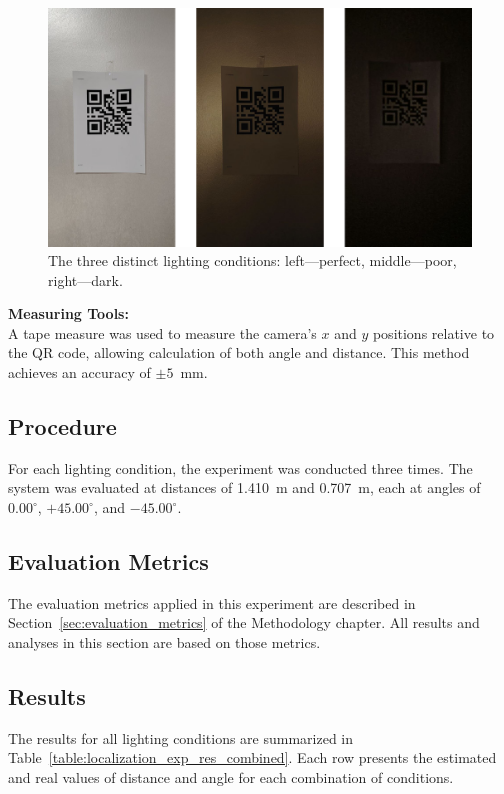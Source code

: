 \begin{figure}[h!]
	\centering
	\includegraphics[width=0.7\linewidth]{assets/ch4/Three lighting conditions/Three lighting conditions.png}
	\caption{The three distinct lighting conditions: left—perfect, middle—poor, right—dark.}
	\label{Localization-Experiment-Lighting-Conditions}
\end{figure}

\textbf{Measuring Tools:}\\
A tape measure was used to measure the camera's $x$ and $y$ positions relative to the QR code, allowing calculation of both angle and distance. This method achieves an accuracy of $\pm5$~mm.

\subsection{Procedure}\label{sec:procedure}
For each lighting condition, the experiment was conducted three times. The system was evaluated at distances of 1.410~m and 0.707~m, each at angles of $0.00^\circ$, $+45.00^\circ$, and $-45.00^\circ$.

\subsection{Evaluation Metrics}
The evaluation metrics applied in this experiment are described in Section~\ref{sec:evaluation_metrics} of the Methodology chapter. All results and analyses in this section are based on those metrics.

\subsection{Results}

The results for all lighting conditions are summarized in Table~\ref{table:localization_exp_res_combined}. Each row presents the estimated and real values of distance and angle for each combination of conditions.

